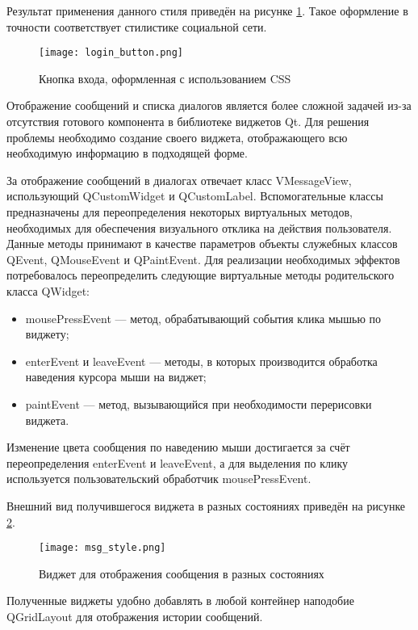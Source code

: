 Результат применения данного стиля приведён на рисунке \ref{fig:login_button}.
Такое оформление в точности соответствует стилистике социальной сети.

\begin{figure}[h]
\centering
\texttt{[image: login\_button.png]}
\caption{Кнопка входа, оформленная с использованием CSS}
\label{fig:login_button}
\end{figure}

Отображение сообщений и списка диалогов является более сложной задачей из-за
отсутствия готового компонента в библиотеке виджетов Qt. Для решения проблемы
необходимо создание своего виджета, отображающего всю необходимую информацию в
подходящей форме. 

За отображение сообщений в диалогах отвечает класс VMessageView,
использующий QCustomWidget и QCustomLabel. Вспомогательные классы предназначены
для переопределения некоторых виртуальных методов, необходимых для обеспечения
визуального отклика на действия пользователя. Данные методы принимают в качестве
параметров объекты служебных классов QEvent, QMouseEvent и QPaintEvent. Для
реализации необходимых эффектов потребовалось переопределить следующие
виртуальные методы родительского класса QWidget:
\begin{itemize}
  \item mousePressEvent --- метод, обрабатывающий события клика мышью по
  виджету;
  \item enterEvent и leaveEvent --- методы, в которых производится обработка
  наведения курсора мыши на виджет;
  \item paintEvent --- метод, вызывающийся при необходимости перерисовки
  виджета.
\end{itemize}

Изменение цвета сообщения по наведению мыши достигается за счёт переопределения
enterEvent и leaveEvent, а для выделения по клику используется
пользовательский обработчик mousePressEvent.

Внешний вид получившегося виджета в разных состояниях приведён на рисунке
\ref{fig:msg_style}.

\begin{figure}[h]
\centering
\texttt{[image: msg\_style.png]}
\caption{Виджет для отображения сообщения в разных состояниях}
\label{fig:msg_style}
\end{figure}

Полученные виджеты удобно добавлять в любой контейнер наподобие QGridLayout для
отображения истории сообщений.

